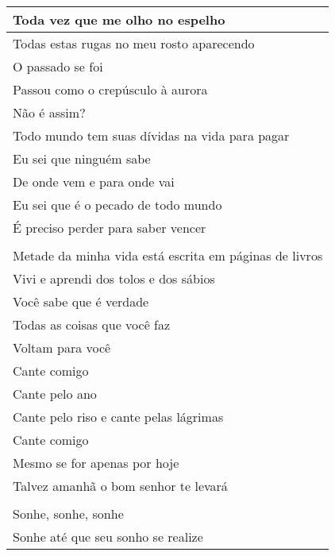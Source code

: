 \begin{longtable}{@{}l@{}}
\toprule
Toda vez que me olho no espelho                        \\* \midrule
\endfirsthead
%
\endhead
%
\bottomrule
\endfoot
%
\endlastfoot
%
Todas estas rugas no meu rosto aparecendo              \\
O passado se foi                                       \\
Passou como o crepúsculo à aurora                      \\
Não é assim?                                           \\
Todo mundo tem suas dívidas na vida para pagar         \\
Eu sei que ninguém sabe                                \\
De onde vem e para onde vai                            \\
Eu sei que é o pecado de todo mundo                    \\
É preciso perder para saber vencer                     \\
                                                       \\
Metade da minha vida está escrita em páginas de livros \\
Vivi e aprendi dos tolos e dos sábios                  \\
Você sabe que é verdade                                \\
Todas as coisas que você faz                           \\
Voltam para você                                       \\
Cante comigo                                           \\
Cante pelo ano                                         \\
Cante pelo riso e cante pelas lágrimas                 \\
Cante comigo                                           \\
Mesmo se for apenas por hoje                           \\
Talvez amanhã o bom senhor te levará                   \\
                                                       \\
Sonhe, sonhe, sonhe                                    \\
Sonhe até que seu sonho se realize                     \\

\end{longtable}
